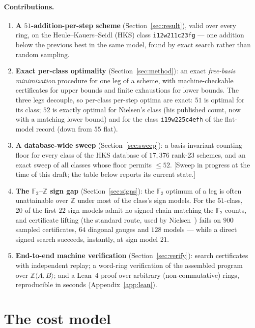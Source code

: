 \documentclass[11pt]{article}
\theoremstyle{definition}
\theoremstyle{remark}
\newcommand{\F}{\mathbb{F}}
\newcommand{\Z}{\mathbb{Z}}
\begin{document}
\paragraph{Contributions.}
\begin{enumerate}
\item \textbf{A $51$-addition-per-step scheme} (Section~\ref{sec:result}),
  valid over every ring, on the Heule--Kauers--Seidl (HKS) class
  \texttt{i12w211c23fg} --- one addition below the previous best in
  the same model, found by exact search rather than random sampling.
\item \textbf{Exact per-class optimality} (Section~\ref{sec:method}):
  an exact \emph{free-basis minimization} procedure for one leg of a
  scheme, with machine-checkable certificates for upper bounds and
  finite exhaustions for lower bounds.  The three legs decouple, so
  per-class per-step optima are exact: $51$ is optimal for its class;
  $52$ is exactly optimal for Nielsen's class (his published count,
  now with a matching lower bound) and for the class
  \texttt{i19w225c4efh} of the flat-model record (down from $55$
  flat).
\item \textbf{A database-wide sweep} (Section~\ref{sec:sweep}): a
  basis-invariant counting floor for every class of the HKS database
  of $17{,}376$ rank-23 schemes, and an exact sweep of all classes
  whose floor permits $\le 52$.  [Sweep in progress at the time of
  this draft; the table below reports its current state.]
\item \textbf{The $\F_2$--$\Z$ sign gap} (Section~\ref{sec:signs}): the
  $\F_2$ optimum of a leg is often unattainable over $\Z$ under most
  of the class's sign models.  For the $51$-class, $20$ of the first
  $22$ sign models admit no signed chain matching the $\F_2$ counts,
  and certificate lifting (the standard route, used by
  Nielsen~\cite{Nielsen26}) fails on $900$ sampled certificates,
  $64$ diagonal gauges and $128$ models --- while a direct signed
  search succeeds, instantly, at sign model $21$.
\item \textbf{End-to-end machine verification}
  (Section~\ref{sec:verify}): search certificates with independent
  replay; a word-ring verification of the assembled program over
  $\Z\langle A,B\rangle$; and a Lean~4 proof over arbitrary
  (non-commutative) rings, reproducible in seconds
  (Appendix~\ref{app:lean}).
\end{enumerate}

\section{The cost model}\label{sec:model}
\end{document}
